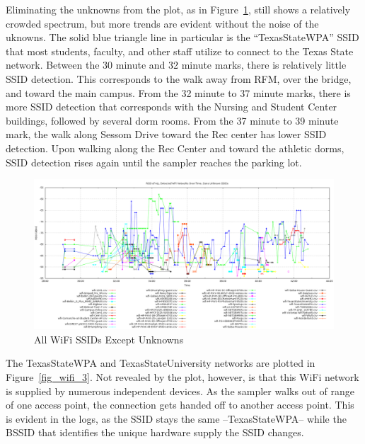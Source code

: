 \documentclass[journal,twocolumn]{IEEEtran}
\begin{document}
Eliminating the unknowns from the plot, as in Figure~\ref{fig_wifi_2}, still
shows a relatively crowded spectrum, but more trends are evident without the
noise of the uknowns. The solid blue triangle line in particular is the
``TexasStateWPA'' SSID that most students, faculty, and other staff utilize to
connect to the Texas State network. Between the 30 minute and 32 minute marks,
there is relatively little SSID detection. This corresponds to the walk away
from RFM, over the bridge, and toward the main campus. From the 32 minute to 
37 minute marks, there is more SSID detection that corresponds with the 
Nursing and Student Center buildings, followed by several dorm rooms. From the
37 minute to 39 minute mark, the walk along Sessom Drive toward the Rec center
has lower SSID detection. Upon walking along the Rec Center and toward the 
athletic dorms, SSID detection rises again until the sampler reaches the 
parking lot.

\begin{figure}
\begin{center}
\includegraphics[scale=0.3]{wifi-data/002-all-but-unknowns.png}
\caption{All WiFi SSIDs Except Unknowns}
\label{fig_wifi_2}
\end{center}
\end{figure}

The TexasStateWPA and TexasStateUniversity networks are plotted in 
Figure~\ref{fig_wifi_3}. Not revealed by the plot, however, is that this 
WiFi network is supplied by numerous independent devices. As the sampler 
walks out of range of one access point, the connection gets handed off to 
another access point. This is evident in the logs, as the SSID stays the 
same --TexasStateWPA-- while the BSSID that identifies the unique hardware 
supply the SSID changes.
\end{document}
